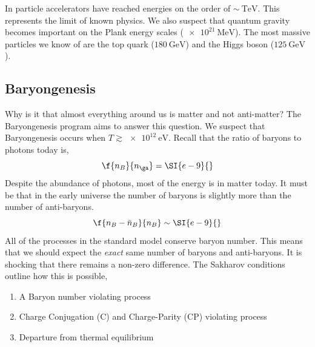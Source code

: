 \documentclass{article}
\begin{document}
\begin{center}
\end{center}

In particle accelerators have reached energies on the order of $\sim\SI{}{\tera \eV}$. This represents the limit of known physics. We also suspect that quantum gravity becomes important on the Plank energy scales ($\SI{e21}{\mega \eV}$). The most massive particles we know of are the top quark ($\SI{180}{\giga \eV}$) and the Higgs boson ($\SI{125}{\giga \eV}$).

\subsection{Baryongenesis}
Why is it that almost everything around us is matter and not anti-matter? The Baryongenesis program aims to answer this question. We suspect that Baryongenesis occurs when $T \gtrsim \SI{e12}{\eV}$. Recall that the ratio of baryons to photons today is,
\[ \f{n_B}{n_\ga} = \SI{e-9}{} \]
Despite the abundance of photons, most of the energy is in matter today. It must be that in the early universe the number of baryons is slightly more than the number of anti-baryons.
\[ \f{n_B - \bar n_{B}}{n_B} \sim \SI{e-9}{} \]
All of the processes in the standard model conserve baryon number. This means that we should expect the \textit{exact} same number of baryons and anti-baryons. It is shocking that there remains a non-zero difference. The Sakharov conditions outline how this is possible,
\begin{enumerate}
    \item A Baryon number violating process
    \item Charge Conjugation (C) and Charge-Parity (CP) violating process
    \item Departure from thermal equilibrium
\end{enumerate}
\end{document}
